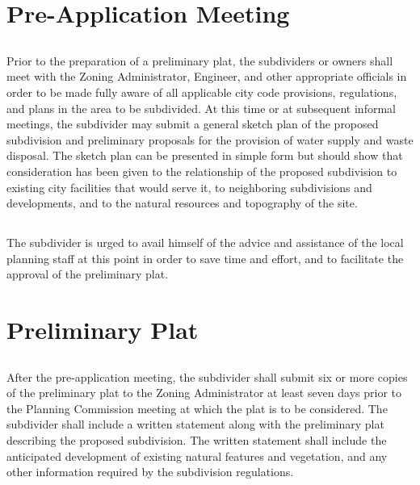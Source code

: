 \section{Pre-Application Meeting}
\subsection{}
Prior to the preparation of a preliminary plat, the subdividers or owners shall meet with the Zoning Administrator, Engineer, and other appropriate officials in order to be made fully aware of all applicable city code provisions, regulations, and plans in the area to be subdivided. At this time or at subsequent informal meetings, the subdivider may submit a general sketch plan of the proposed subdivision and preliminary proposals for the provision of water supply and waste disposal. The sketch plan can be presented in simple form but should show that consideration has been given to the relationship of the proposed subdivision to existing city facilities that would serve it, to neighboring subdivisions and developments, and to the natural resources and topography of the site.
\subsection{}
The subdivider is urged to avail himself of the advice and assistance of the local planning staff at this point in order to save time and effort, and to facilitate the approval of the preliminary plat.

\section{Preliminary Plat}
\subsection{}
After the pre-application meeting, the subdivider shall submit six or more copies of the preliminary plat to the Zoning Administrator at least seven days prior to the Planning Commission meeting at which the plat is to be considered. The subdivider shall include a written statement along with the preliminary plat describing the proposed subdivision. The written statement shall include the anticipated development of existing natural features and vegetation, and any other information required by the subdivision regulations.
